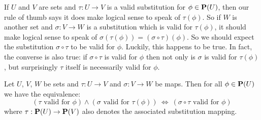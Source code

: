 If $U$ and $V$ are sets and $\tau:U\to V$ is a valid substitution
for $\phi\in{\bf P}(U)$, then our rule of thumb says it does make
logical sense to speak of $\tau(\phi)$. So if $W$ is another set and
$\sigma:V\to W$ is a substitution which is valid for $\tau(\phi)$,
it should make logical sense to speak of
$\sigma(\tau(\phi))=(\sigma\circ\tau)(\phi)$. So we should expect
the substitution $\sigma\circ\tau$ to be valid for $\phi$. Luckily,
this happens to be true. In fact, the converse is also true: if
$\sigma\circ\tau$ is valid for $\phi$ then not only is $\sigma$ is
valid for $\tau(\phi)$, but surprisingly $\tau$ itself is
necessarily valid for $\phi$.

\begin{prop}\label{logic:prop:FOPL:valid:composition}
    Let $U$, $V$, $W$ be sets and $\tau:U\to V$ and $\sigma:V\to W$ be
    maps. Then for all $\phi\in{\bf P}(U)$ we have the equivalence:
    \[
        (\mbox{$\tau$ valid for $\phi$})\land(\mbox{$\sigma$ valid for
        $\tau(\phi)$})\ 
            \Leftrightarrow\ 
        (\mbox{$\sigma\circ\tau$ valid for $\phi$})
    \]
    where $\tau:{\bf P}(U)\to{\bf P}(V)$ also denotes the associated
    substitution mapping.
\end{prop}
